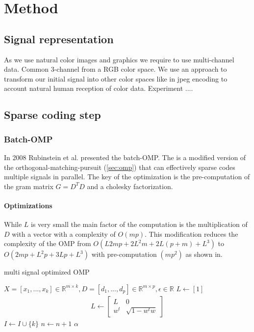 \chapter{Method}


\section{Signal representation}
\label{sec:signal_representation}
As we use natural color images and graphics we require to use multi-channel
data. Common 3-channel from a RGB color space. %
We use an approach to transform our initial signal into other color spaces like
in jpeg encoding to account natural human reception of color data. Experiment
....


\section{Sparse coding step}
\subsection{Batch-OMP}
In 2008 Rubinstein et al.\cite{Rubinstein2008} presented the batch-OMP. The
 is a modified version of the
orthogonal-matching-pursuit (\ref{sec:omp}) that can effectively sparse codes
multiple signals in parallel. The key of the optimization is the pre-computation
of the gram matrix $G=D^TD$ and a cholesky factorization.

\subsubsection*{Optimizations}
While $L$ is very small the main factor of the computation is
the multiplication of $D$ with a vector with a complexity of $O(mp)$. 
This modification reduces the complexity of the OMP from $O\left(L2mp + 2L^2m +
2L(p+m) + L^3\right)$ to $O\left(2mp + L^2p + 3Lp + L^3\right)$ 
with pre-computation $\left(mp^2\right)$ as shown in\cite{Rubinstein2008}. 


\begin{algorithm}
\caption{multi signal optimized OMP}
\label{alg:batchOMP}
\begin{algorithmic}[1]
\REQUIRE $X =[x_1,...,x_k]  \in \mathbb{R}^{m \times k}, D  =[d_1,...,d_p]  \in
\mathbb{R}^{m\times p}, \epsilon \in \mathbb{R}$
\STATE $L\gets[1]$
\STATE
{}
\STATE
\begin{align}
L \gets \left[
\begin{array}{ccc}
L & 0\\
w^t & \sqrt{1-w^tw}
\end{array}
\right]
\end{align}
\ENDIF
\STATE $I \gets I \cup \{ k\}$
\STATE
\STATE $n \gets n+1$
\ENDWHILE
\RETURN $\alpha$
\end{algorithmic}
\end{algorithm}

